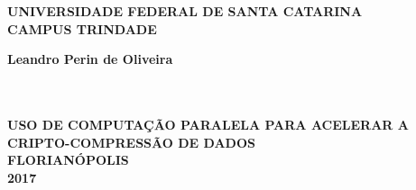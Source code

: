 \thispagestyle{empty}

\vfill
 \begin{center}
    

    {\large\bfseries UNIVERSIDADE FEDERAL DE SANTA CATARINA} \\
    
   
    {\large\bfseries CAMPUS TRINDADE}  \\ 

    \vspace*{1in}
    \begin{large} \bfseries Leandro Perin de Oliveira \end{large}\\[0.4in]

    \vspace*{4cm}
    \noindent \\
    
    \large\bfseries{USO DE COMPUTAÇÃO PARALELA PARA ACELERAR A CRIPTO-COMPRESSÃO DE DADOS} \\
    \vfill
    \large\bfseries{ FLORIANÓPOLIS \\ 2017}
\end{center}

\normalsize



